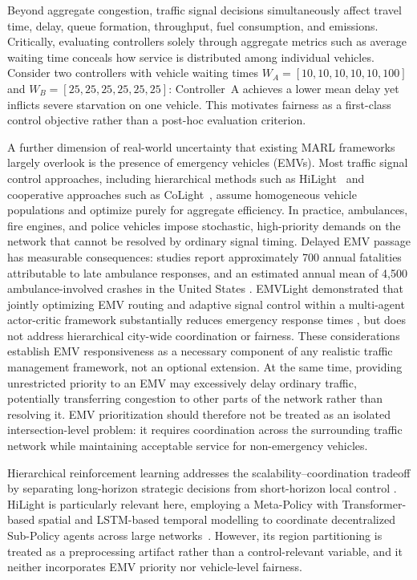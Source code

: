 \documentclass[3p,times]{elsarticle}
\theoremstyle{plain}
\theoremstyle{definition}
\begin{document}
Beyond aggregate congestion, traffic signal decisions simultaneously
affect travel time, delay, queue formation, throughput, fuel
consumption, and emissions. Critically, evaluating controllers solely
through aggregate metrics such as average waiting time conceals how
service is distributed among individual vehicles. Consider two
controllers with vehicle waiting times
$W_A = [10, 10, 10, 10, 10, 100]$ and
$W_B = [25, 25, 25, 25, 25, 25]$: Controller~A achieves a lower mean
delay yet inflicts severe starvation on one vehicle. This motivates
fairness as a first-class control objective rather than a post-hoc
evaluation criterion.

A further dimension of real-world uncertainty that existing MARL
frameworks largely overlook is the presence of emergency vehicles
(EMVs). Most traffic signal control approaches, including hierarchical
methods such as HiLight~\cite{hilight} and cooperative approaches such
as CoLight~\cite{colight}, assume homogeneous vehicle populations and
optimize purely for aggregate efficiency. In practice, ambulances,
fire engines, and police vehicles impose stochastic, high-priority
demands on the network that cannot be resolved by ordinary signal
timing. Delayed EMV passage has measurable consequences: studies
report approximately 700 annual fatalities attributable to late
ambulance responses, and an estimated annual mean of 4{,}500
ambulance-involved crashes in the United States
\cite{nellore2016}. EMVLight demonstrated that jointly optimizing EMV
routing and adaptive signal control within a multi-agent actor-critic
framework substantially reduces emergency response times
\cite{emvlight}, but does not address hierarchical city-wide
coordination or fairness. These considerations establish EMV
responsiveness as a necessary component of any realistic traffic
management framework, not an optional extension. At the same time,
providing unrestricted priority to an EMV may excessively delay
ordinary traffic, potentially transferring congestion to other parts
of the network rather than resolving it. EMV prioritization should
therefore not be treated as an isolated intersection-level problem: it
requires coordination across the surrounding traffic network while
maintaining acceptable service for non-emergency vehicles.

Hierarchical reinforcement learning addresses the
scalability--coordination tradeoff by separating long-horizon
strategic decisions from short-horizon local control
\cite{feudalhrl,hirol}. HiLight is particularly relevant here,
employing a Meta-Policy with Transformer-based spatial and LSTM-based
temporal modelling to coordinate decentralized Sub-Policy agents
across large networks~\cite{hilight}. However, its region
partitioning is treated as a preprocessing artifact rather than a
control-relevant variable, and it neither incorporates EMV priority
nor vehicle-level fairness.
\end{document}
